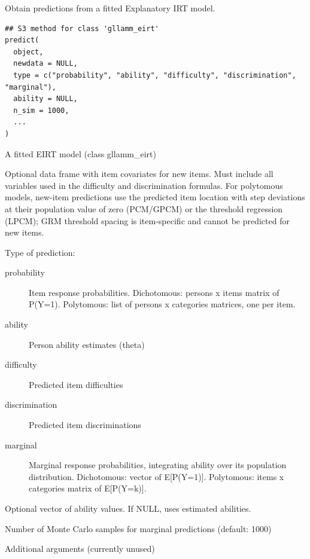 \documentclass[a4paper]{book}
\begin{document}
%
\begin{Description}
Obtain predictions from a fitted Explanatory IRT model.
\end{Description}
%
\begin{Usage}
\begin{verbatim}
## S3 method for class 'gllamm_eirt'
predict(
  object,
  newdata = NULL,
  type = c("probability", "ability", "difficulty", "discrimination", "marginal"),
  ability = NULL,
  n_sim = 1000,
  ...
)
\end{verbatim}
\end{Usage}
%
\begin{Arguments}
\begin{ldescription}
\item[\code{object}] A fitted EIRT model (class gllamm\_eirt)

\item[\code{newdata}] Optional data frame with item covariates for new items.
Must include all variables used in the difficulty and discrimination
formulas. For polytomous models, new-item predictions use the predicted
item location with step deviations at their population value of zero
(PCM/GPCM) or the threshold regression (LPCM); GRM threshold spacing is
item-specific and cannot be predicted for new items.

\item[\code{type}] Type of prediction:
\begin{description}

\item[probability] Item response probabilities. Dichotomous: persons x
items matrix of P(Y=1). Polytomous: list of persons x categories
matrices, one per item.
\item[ability] Person ability estimates (theta)
\item[difficulty] Predicted item difficulties
\item[discrimination] Predicted item discriminations
\item[marginal] Marginal response probabilities, integrating ability
over its population distribution. Dichotomous: vector of E[P(Y=1)].
Polytomous: items x categories matrix of E[P(Y=k)].

\end{description}


\item[\code{ability}] Optional vector of ability values. If NULL, uses estimated abilities.

\item[\code{n\_sim}] Number of Monte Carlo samples for marginal predictions (default: 1000)

\item[\code{...}] Additional arguments (currently unused)
\end{ldescription}
\end{Arguments}
\end{document}
